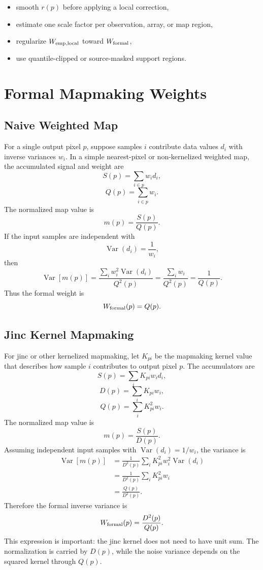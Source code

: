 \documentclass[11pt]{article}
\newcommand{\var}{\operatorname{Var}}
\begin{document}
\begin{itemize}[leftmargin=1.5em]
\item smooth \(r(p)\) before applying a local correction,
\item estimate one scale factor per observation, array, or map region,
\item regularize \(W_{\rm emp,local}\) toward \(W_{\rm formal}\),
\item use quantile-clipped or source-masked support regions.
\end{itemize}

\section{Formal Mapmaking Weights}

\subsection{Naive Weighted Map}

For a single output pixel \(p\), suppose samples \(i\) contribute data values
\(d_i\) with inverse variances \(w_i\). In a simple nearest-pixel or
non-kernelized weighted map, the accumulated signal and weight are
\[
  S(p) = \sum_{i\in p} w_i d_i,
\]
\[
  Q(p) = \sum_{i\in p} w_i.
\]
The normalized map value is
\[
  m(p) = \frac{S(p)}{Q(p)}.
\]
If the input samples are independent with
\[
  \var(d_i) = \frac{1}{w_i},
\]
then
\[
  \var[m(p)] =
    \frac{\sum_i w_i^2 \var(d_i)}{Q^2(p)}
    =
    \frac{\sum_i w_i}{Q^2(p)}
    =
    \frac{1}{Q(p)}.
\]
Thus the formal weight is
\[
  W_{\rm formal}(p) = Q(p).
\]

\subsection{Jinc Kernel Mapmaking}

For jinc or other kernelized mapmaking, let \(K_{pi}\) be the mapmaking kernel
value that describes how sample \(i\) contributes to output pixel \(p\). The
accumulators are
\[
  S(p) = \sum_i K_{pi} w_i d_i,
\]
\[
  D(p) = \sum_i K_{pi} w_i,
\]
\[
  Q(p) = \sum_i K_{pi}^2 w_i.
\]
The normalized map value is
\[
  m(p) = \frac{S(p)}{D(p)}.
\]
Assuming independent input samples with \(\var(d_i)=1/w_i\), the variance is
\[
\begin{aligned}
  \var[m(p)]
    &=
    \frac{1}{D^2(p)}
    \sum_i K_{pi}^2 w_i^2 \var(d_i) \\
    &=
    \frac{1}{D^2(p)}
    \sum_i K_{pi}^2 w_i \\
    &=
    \frac{Q(p)}{D^2(p)}.
\end{aligned}
\]
Therefore the formal inverse variance is
\[
  W_{\rm formal}(p) =
    \frac{D^2(p)}{Q(p)}.
\]
This expression is important: the jinc kernel does not need to have unit sum.
The normalization is carried by \(D(p)\), while the noise variance depends on
the squared kernel through \(Q(p)\).
\end{document}
